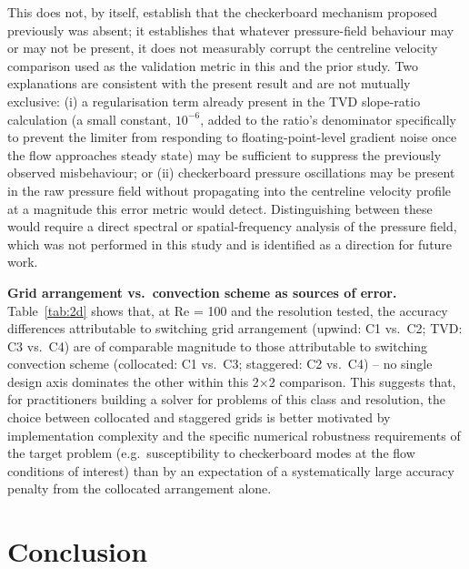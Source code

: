 \documentclass[CHICAGO]{USG}
\begin{document}
This does not, by itself, establish that the checkerboard mechanism proposed previously was absent; it establishes that whatever pressure-field behaviour may or may not be present, it does not measurably corrupt the centreline velocity comparison used as the validation metric in this and the prior study. Two explanations are consistent with the present result and are not mutually exclusive: (i) a regularisation term already present in the TVD slope-ratio calculation (a small constant, $10^{-6}$, added to the ratio's denominator specifically to prevent the limiter from responding to floating-point-level gradient noise once the flow approaches steady state) may be sufficient to suppress the previously observed misbehaviour; or (ii) checkerboard pressure oscillations may be present in the raw pressure field without propagating into the centreline velocity profile at a magnitude this error metric would detect. Distinguishing between these would require a direct spectral or spatial-frequency analysis of the pressure field, which was not performed in this study and is identified as a direction for future work.

\textbf{Grid arrangement vs.\ convection scheme as sources of error.} Table~\ref{tab:2d} shows that, at Re = 100 and the resolution tested, the accuracy differences attributable to switching grid arrangement (upwind: C1 vs.\ C2; TVD: C3 vs.\ C4) are of comparable magnitude to those attributable to switching convection scheme (collocated: C1 vs.\ C3; staggered: C2 vs.\ C4) -- no single design axis dominates the other within this 2$\times$2 comparison. This suggests that, for practitioners building a solver for problems of this class and resolution, the choice between collocated and staggered grids is better motivated by implementation complexity and the specific numerical robustness requirements of the target problem (e.g.\ susceptibility to checkerboard modes at the flow conditions of interest) than by an expectation of a systematically large accuracy penalty from the collocated arrangement alone.

\section{Conclusion}
\end{document}
